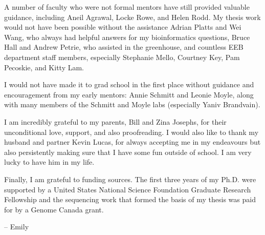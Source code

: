 \documentclass{ut-thesis}
\begin{document}
\begin{preliminary}
\begin{acknowledgements}
A number of faculty who were not formal mentors have still provided valuable guidance, including Aneil Agrawal, Locke Rowe, and Helen Rodd. My thesis work would not have been possible without the assistance Adrian Platts and Wei Wang, who always had helpful answers for my bioinformatics questions, Bruce Hall and Andrew Petrie, who assisted in the greenhouse, and countless EEB department staff members, especially Stephanie Mello, Courtney Key, Pam Pecoskie, and Kitty Lam. 

I would not have made it to grad school in the first place without guidance and encouragement from my early mentors: Annie Schmitt and Leonie Moyle, along with many members of the Schmitt and Moyle labs (especially Yaniv Brandvain).

I am incredibly grateful to my parents, Bill and Zina Josephs, for their unconditional love, support, and also proofreading. I would also like to thank my husband and partner Kevin Lucas, for always accepting me in my endeavours but also persistently making sure that I have some fun outside of school. I am very lucky to have him in my life.

Finally, I am grateful to funding sources. The first three years of my Ph.D. were supported by a United States National Science Foundation Graduate Research Fellowship and the sequencing work that formed the basis of my thesis was paid for by a Genome Canada grant.

-- Emily

\end{acknowledgements}

\tableofcontents

\listoftables

\listoffigures


\end{preliminary}


\end{document}
